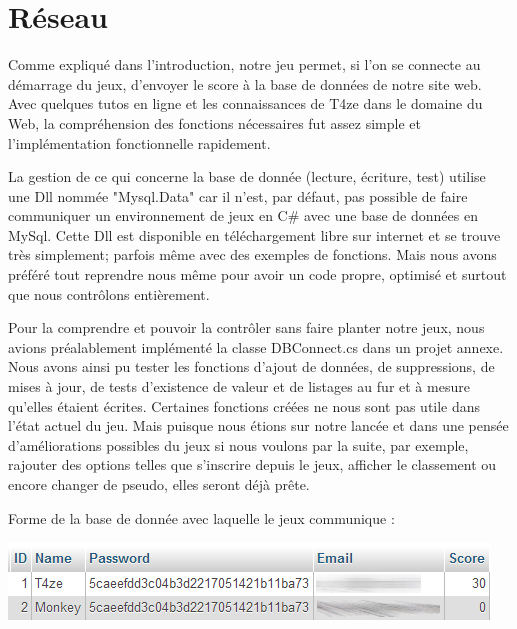 \documentclass [11pt]{report}
\begin{document}
			
	
	
	\newpage
	
	\section{Réseau}
	Comme expliqué dans l'introduction, notre jeu permet, si l'on se connecte au démarrage du jeux, d'envoyer le score à la base de données de notre site web.\\
	
	Avec quelques tutos en ligne et les connaissances de T4ze dans le domaine du Web, la compréhension des fonctions nécessaires fut assez simple et l'implémentation fonctionnelle rapidement.
	
	La gestion de ce qui concerne la base de donnée (lecture, écriture, test) utilise une Dll nommée "Mysql.Data" car il n'est, par défaut, pas possible de faire communiquer un environnement de jeux en C\# avec une base de données en MySql. Cette Dll est disponible en téléchargement libre sur internet et se trouve très simplement; parfois même avec des exemples de fonctions. Mais nous avons préféré tout reprendre nous même pour avoir un code propre, optimisé et surtout que nous contrôlons entièrement.
	
	Pour la comprendre et pouvoir la contrôler sans faire planter notre jeux, nous avions préalablement implémenté la classe DBConnect.cs dans un projet annexe. Nous avons ainsi pu tester les fonctions d'ajout de données, de suppressions, de mises à jour, de tests d'existence de valeur et de listages au fur et à mesure qu'elles étaient écrites. Certaines fonctions créées ne nous sont pas utile dans l'état actuel du jeu. Mais puisque nous étions sur notre lancée et dans une pensée d'améliorations possibles du jeux si nous voulons par la suite, par exemple, rajouter des options telles que s'inscrire depuis le jeux, afficher le classement ou encore changer de pseudo, elles seront déjà prête.\\
	
	\vspace{4mm}
	
	\noindent Forme de la base de donnée avec laquelle le jeux communique :
	\begin{center}
		\includegraphics[scale = 0.8]{images/Bdd.png}
	\end{center}
		
\end{document}
